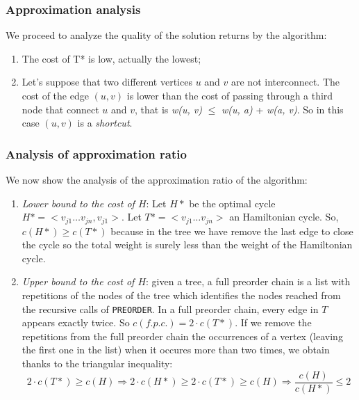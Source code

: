 \subsubsection{Approximation analysis}
We proceed to analyze the quality of the solution returns by the algorithm:
\begin{enumerate}
    \item The cost of T* is low, actually the lowest;
    \item Let's suppose that two different vertices $u$ and $v$ are not interconnect. The cost of the edge $(u, v)$ is lower than the cost of passing through a third node that connect $u$ and $v$, that is \textit{w(u, v)} $\leq$ \textit{w(u, a)} +{ \textit{w(a, v)}}. So in this case $(u, v)$ is a \textit{shortcut}.
\end{enumerate}

\subsubsection{Analysis of approximation ratio}
We now show the analysis of the approximation ratio of the algorithm:
\begin{enumerate}
    \item \textit{Lower bound to the cost of $H$}: Let $H*$ be the optimal cycle $H* = <v_{j1} \dots v_{jn}, v_{j1}>$. Let $T* = <v_{j1} \dots v_{jn}>$ an Hamiltonian cycle. So, $c(H*) \ge c(T*)$ because in the tree we have remove the last edge to close the cycle so the total weight is surely less than the weight of the Hamiltonian cycle.
    \item \textit{Upper bound to the cost of $H$}: given a tree, a full preorder chain is a list with repetitions of the nodes of the tree which identifies the nodes reached from the recursive calls of \verb|PREORDER|. In a full preorder chain, every edge in $T$ appears exactly twice. So $c(f.p.c.) = 2 \cdot c(T*)$. If we remove the repetitions from the full preorder chain the occurrences of a vertex (leaving the first one in the list) when it occures more than two times, we obtain thanks to the triangular inequality:
    \[
        2 \cdot c(T*) \ge c(H) \Rightarrow 2 \cdot c(H*) \ge 2 \cdot c(T*) \ge c(H)
        \Rightarrow \frac{c(H)}{c(H*)} \le 2
    \]
\end{enumerate}

